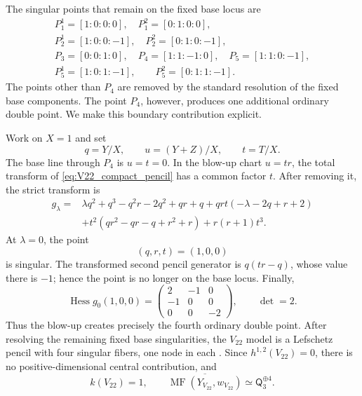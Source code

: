 \documentclass[11pt]{amsart}
\theoremstyle{definition}
\theoremstyle{remark}
\DeclareMathOperator{\MF}{MF}
\newcommand{\MorseCat}[1]{\mathsf{Q}_{#1}}
\begin{document}
The singular points that remain on the fixed base locus are
\[
\begin{gathered}
P_1^1=[1:0:0:0],\quad P_1^2=[0:1:0:0],\\
P_2^1=[1:0:0:-1],\quad P_2^2=[0:1:0:-1],\\
P_3=[0:0:1:0],\quad P_4=[1:1:-1:0],\quad
P_5=[1:1:0:-1],\\
P_5^1=[1:0:1:-1],\qquad P_5^2=[0:1:1:-1].
\end{gathered}
\]
The points other than $P_4$ are removed by the standard resolution of the
fixed base components.  The point $P_4$, however, produces one additional
ordinary double point.  We make this boundary contribution explicit.

Work on $X=1$ and set
\[
q=Y/X,\qquad u=(Y+Z)/X,\qquad t=T/X.
\]
The base line through $P_4$ is $u=t=0$.  In the blow-up chart $u=tr$, the
total transform of \eqref{eq:V22_compact_pencil} has a common factor $t$.
After removing it, the strict transform is
\begin{equation}
\label{eq:V22_boundary_strict_transform}
\begin{aligned}
g_\lambda={}&
\lambda q^2+q^3-q^2r-2q^2+qr+q
+qrt(-\lambda-2q+r+2)\\
&+t^2(qr^2-qr-q+r^2+r)+r(r+1)t^3.
\end{aligned}
\end{equation}
At $\lambda=0$, the point
\begin{equation}
\label{eq:V22_boundary_node}
(q,r,t)=(1,0,0)
\end{equation}
is singular.  The transformed second pencil generator is
$q(tr-q)$, whose value there is $-1$; hence the point is no longer on the
base locus.  Finally,
\begin{equation}
\label{eq:V22_boundary_hessian}
\operatorname{Hess}g_0(1,0,0)
=
\begin{pmatrix}
2&-1&0\\
-1&0&0\\
0&0&-2
\end{pmatrix},
\qquad
\det=2.
\end{equation}
Thus the blow-up creates precisely the fourth ordinary double point.  After
resolving the remaining fixed base singularities, the $V_{22}$ model is a
Lefschetz pencil with four singular fibers, one node in each
\cite{Przyjalkowski2026}.  Since $h^{1,2}(V_{22})=0$, there is no
positive-dimensional central contribution, and
\begin{equation}
\label{eq:V22_compact_final_decomposition}
k(V_{22})=1,
\qquad
\overline{\MF(Y_{V_{22}},w_{V_{22}})}
\simeq
\MorseCat{3}^{\oplus4}.
\end{equation}
\end{document}
